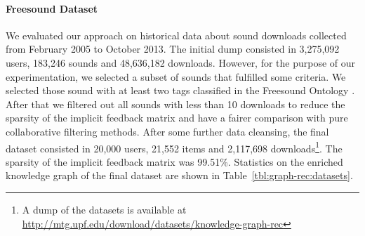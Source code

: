 \paragraph*{\textbf{Freesound Dataset}}\label{fs_dataset}
We evaluated our approach on historical data about sound downloads collected from February 2005 to October 2013. The initial dump consisted in 3,275,092 users, 183,246 sounds and 48,636,182 downloads. However, for the purpose of our experimentation, we selected a subset of sounds that fulfilled some criteria. We selected those sound with at least two tags classified in the Freesound Ontology \cite{Font2014}. After that we filtered out all sounds with less than 10 downloads to reduce the sparsity of the implicit feedback matrix and have a fairer comparison with pure collaborative filtering methods. 
After some further data cleansing, the final dataset consisted in 20,000 users, 21,552 items and 2,117,698 downloads\footnote{ A dump of the datasets is available at \url{http://mtg.upf.edu/download/datasets/knowledge-graph-rec}}. The sparsity of the implicit feedback matrix was 99.51\%. Statistics on the enriched knowledge graph of the final dataset are shown in Table~\ref{tbl:graph-rec:datasets}.


